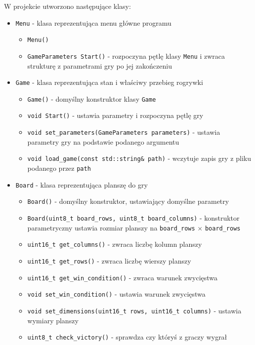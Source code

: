 \documentclass{article}
\begin{document}
W projekcie utworzono następujące klasy:
\begin{itemize}
    \item \texttt{Menu} - klasa reprezentująca menu główne programu
        \begin{itemize}
            \item \texttt{Menu()}
            \item \texttt{GameParameters Start()} - rozpoczyna pętlę klasy \texttt{Menu} i zwraca strukturę z parametrami gry po jej zakończeniu
        \end{itemize}

    \item \texttt{Game} - klasa reprezentująca stan i właściwy przebieg rogrywki
        \begin{itemize}
            \item \texttt{Game()} - domyślny konstruktor klasy \texttt{Game}
            \item \texttt{void Start()} - ustawia parametry i rozpoczyna pętlę gry
            \item \texttt{void set\_parameters(GameParameters parameters)} - ustawia parametry gry na podstawie podanego argumentu
            \item \texttt{void load\_game(const std::string\& path)} - wczytuje zapis gry z pliku podanego przez \texttt{path}
        \end{itemize}

    \item \texttt{Board} - klasa reprezentująca planszę do gry
        \begin{itemize}
            \item \texttt{Board()} - domyślny konstruktor, ustawiający domyślne parametry
            \item \texttt{Board(uint8\_t board\_rows, uint8\_t board\_columns)} - konstruktor parametryczny ustawia rozmiar planszy na \texttt{board\_rows} $\times$ \texttt{board\_rows}
            \item \texttt{uint16\_t get\_columns()} - zwraca liczbę kolumn planszy
            \item \texttt{uint16\_t get\_rows()} - zwraca liczbę wierszy planszy
            \item \texttt{uint16\_t get\_win\_condition()} - zwraca warunek zwycięstwa
            \item \texttt{void set\_win\_condition()} - ustawia warunek zwycięstwa
            \item \texttt{void set\_dimensions(uint16\_t rows, uint16\_t columns)} - ustawia wymiary planszy
            \item \texttt{uint8\_t check\_victory()} - sprawdza czy któryś z graczy wygrał
        \end{itemize}
\end{itemize}
     
\end{document}
